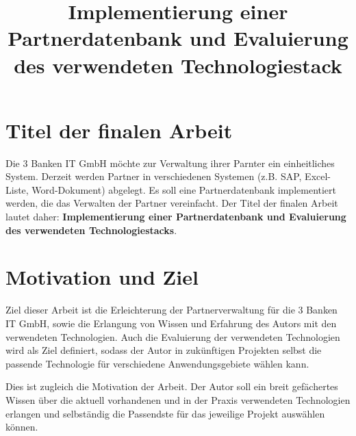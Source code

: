 \documentclass[master,german]{hgbthesis}
\title{Implementierung einer Partnerdatenbank und Evaluierung des verwendeten Technologiestack} %
\begin{document}

\frontmatter							%



%

\mainmatter          			%

\section{Titel der finalen Arbeit}
Die 3 Banken IT GmbH möchte zur Verwaltung ihrer Parnter ein einheitliches System. Derzeit werden Partner in verschiedenen Systemen (z.B. SAP, Excel-Liste, Word-Dokument) abgelegt. Es soll eine Partnerdatenbank implementiert werden, die das Verwalten der Partner vereinfacht.
Der Titel der finalen Arbeit lautet daher: \glqq \textbf{Implementierung einer Partnerdatenbank und Evaluierung des verwendeten Technologiestacks}\grqq.

{\let\clearpage\relax \section{Motivation und Ziel}}
Ziel dieser Arbeit ist die Erleichterung der Partnerverwaltung für die 3 Banken IT GmbH, sowie die Erlangung von Wissen und Erfahrung des Autors mit den verwendeten Technologien. Auch die Evaluierung der verwendeten Technologien wird als Ziel definiert, sodass der Autor in zukünftigen Projekten selbst die passende Technologie für verschiedene Anwendungsgebiete wählen kann.

Dies ist zugleich die Motivation der Arbeit. Der Autor soll ein breit gefächertes Wissen über die aktuell vorhandenen und in der Praxis verwendeten Technologien erlangen und selbständig die Passendste für das jeweilige Projekt auswählen können.
\end{document}
